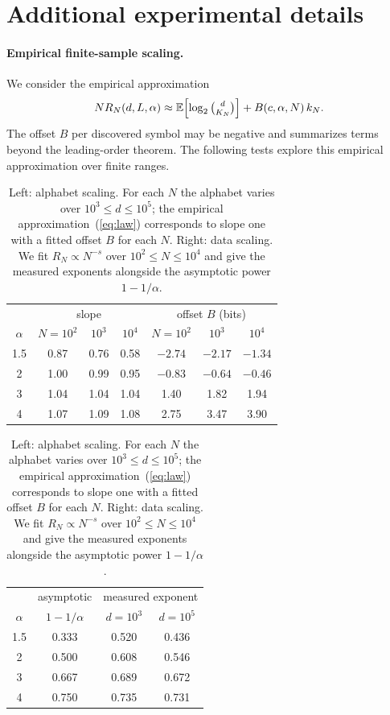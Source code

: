 \documentclass[anon]{alt2027}
\newcommand{\E}{\mathbb{E}}
\renewcommand{\eqref}[1]{(\ref{#1})}
\begin{document}
\section{Additional experimental details}
\label{app:experiments} \suppressfloats[t]

\paragraph{Empirical finite-sample scaling.}
We consider the empirical approximation
\begin{equation}
\label{eq:law}
N R_N(d,L,\alpha)\approx\E\Bigl[\log_2\tbinom{d}{K_N}\Bigr]+B(c,\alpha,N)\,k_N.
\end{equation}
The offset $B$ per discovered symbol may be negative and summarizes terms beyond the leading-order theorem. The following tests explore this empirical approximation over finite ranges.

 

\begin{table}[!htbp]
\centering
\caption{Left: alphabet scaling. For each $N$ the alphabet varies over $10^3\le d\le10^5$; the empirical approximation~\eqref{eq:law} corresponds to slope one with a fitted offset $B$ for each $N$. Right: data scaling. We fit $R_N\propto N^{-s}$ over $10^2\le N\le10^4$ and give the measured exponents alongside the asymptotic power $1-1/\alpha$.}
\label{tab:alphabet}\label{tab:data}
\footnotesize\setlength{\tabcolsep}{3.5pt}
\begin{tabular}{c ccc ccc}
\toprule
& \multicolumn{3}{c}{slope} & \multicolumn{3}{c}{offset $B$ (bits)} \\
$\alpha$ & $N{=}10^2$ & $10^3$ & $10^4$ & $N{=}10^2$ & $10^3$ & $10^4$ \\
\midrule
1.5 & 0.87 & 0.76 & 0.58 & $-2.74$ & $-2.17$ & $-1.34$ \\
2 & 1.00 & 0.99 & 0.95 & $-0.83$ & $-0.64$ & $-0.46$ \\
3 & 1.04 & 1.04 & 1.04 & 1.40 & 1.82 & 1.94 \\
4 & 1.07 & 1.09 & 1.08 & 2.75 & 3.47 & 3.90 \\
\bottomrule
\end{tabular}
\hfill
\begin{tabular}{c c cc}
\toprule
& asymptotic & \multicolumn{2}{c}{measured exponent} \\
$\alpha$ & $1{-}1/\alpha$ & $d=10^3$ & $d=10^5$ \\
\midrule
1.5 & 0.333 & 0.520 & 0.436 \\
2 & 0.500 & 0.608 & 0.546 \\
3 & 0.667 & 0.689 & 0.672 \\
4 & 0.750 & 0.735 & 0.731 \\
\bottomrule
\end{tabular}
\end{table}
\end{document}
